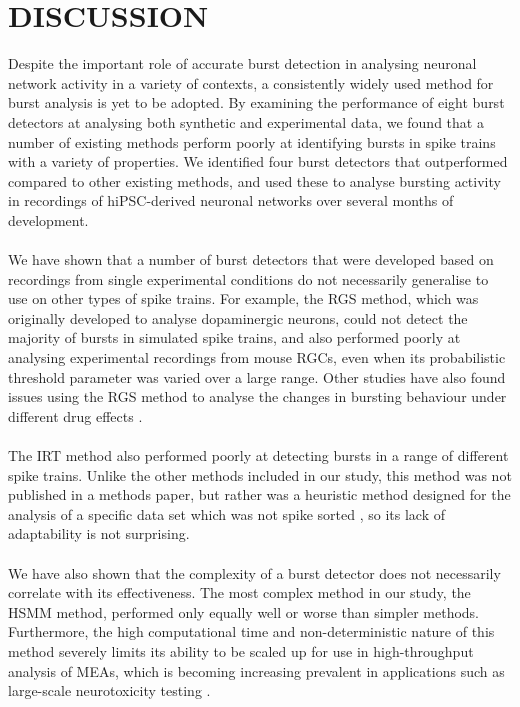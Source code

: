 \documentclass[12pt, titlepage]{article}
\begin{document}
	\section*{DISCUSSION}
	Despite the important role of accurate burst detection in analysing neuronal network activity in a variety of contexts, a consistently widely used method for burst analysis is yet to be adopted. By examining the performance of eight burst detectors at analysing both synthetic and experimental data, we found that a number of existing methods perform poorly at identifying bursts in spike trains with a variety of properties. We identified four burst detectors that outperformed compared to other existing methods, and used these to analyse bursting activity in recordings of hiPSC-derived neuronal networks over several months of development.
	\\ \\We have shown that a number of burst detectors that were developed based on recordings from single experimental conditions do not necessarily generalise to use on other types of spike trains. For example, the RGS method, which was originally developed to analyse dopaminergic neurons, could not detect the majority of bursts in simulated spike trains, and also performed poorly at analysing experimental recordings from mouse RGCs, even when its probabilistic threshold parameter was varied over a large range. Other studies have also found issues using the RGS method to analyse the changes in bursting behaviour under different drug effects \cite{Eisenman2015}. 
	\\ \\The IRT method also performed poorly at detecting bursts in a range of different spike trains. Unlike the other methods included in our study, this method was not published in a methods paper, but rather was a heuristic method designed for the analysis of a specific data set which was not spike sorted \cite{Hennig2011}, so its lack of adaptability is not surprising.
	\\ \\We have also shown that the complexity of a burst detector does not necessarily correlate with its effectiveness. The most complex method in our study, the HSMM method, performed only equally well or worse than simpler methods. Furthermore, the high computational time and non-deterministic nature of this method severely limits its ability to be scaled up for use in high-throughput analysis of MEAs, which is becoming increasing prevalent in applications such as large-scale neurotoxicity testing \cite{Nicolas2014}.
\end{document}
